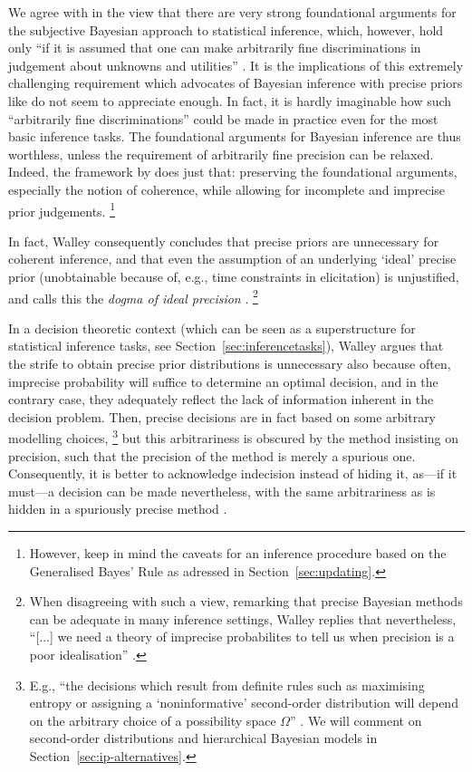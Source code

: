 We agree with \textcite[\S 1.1]{1994:berger} in the view that there are very strong foundational arguments
for the subjective Bayesian approach to statistical inference, which, however, hold only
``if it is assumed that one can make arbitrarily fine discriminations
in judgement about unknowns and utilities'' \parencite[p.~303]{1994:berger}. 
It is the implications of this extremely challenging requirement
which advocates of Bayesian inference with precise priors
like \textcite{1987:lindley} do not seem to appreciate enough.
In fact, it is hardly imaginable how such ``arbitrarily fine discriminations''
could be made in practice even for the most basic inference tasks.
The foundational arguments for Bayesian inference are thus worthless,
unless the requirement of arbitrarily fine precision can be relaxed.
Indeed, the framework by \textcite{1991:walley} does just that:
preserving the foundational arguments, especially the notion of coherence,
while allowing for incomplete and imprecise prior judgements.%
\footnote{However, keep in mind the caveats for an inference procedure based on the Generalised Bayes' Rule
as adressed in Section~\ref{sec:updating}.}

In fact, Walley consequently concludes that precise priors are unnecessary for coherent inference,
and that even the assumption of an underlying `ideal' precise prior
(unobtainable because of, e.g., time constraints in elicitation) is unjustified, %
and calls this the \emph{dogma of ideal precision} \parencite[\S 5.9]{1991:walley}.%
\footnote{When disagreeing with such a view, remarking that
precise Bayesian methods can be adequate in many inference settings,
Walley replies that nevertheless,
``[...] we need a theory of imprecise probabilites to tell us when precision is a poor idealisation''
\parencite[\S 5.8.1, item~3, p.~250]{1991:walley}.}

In a decision theoretic context
(which can be seen as a superstructure for statistical inference tasks, see Section~\ref{sec:inferencetasks}),
Walley argues that the strife to obtain precise prior distributions is unnecessary
also because often, imprecise probability will suffice to determine an optimal decision,
and in the contrary case, they adequately reflect the lack of information inherent in the decision problem.
Then, precise decisions are in fact based on some arbitrary modelling choices,%
\footnote{E.g., %
``the decisions which result from definite rules
such as maximising entropy or assigning a `noninformative' second-order distribution
will depend on the arbitrary choice of a possibility space $\Omega$''
\parencite[\S 5.6, footnote~16, p.~531]{1991:walley}.
We will comment on second-order distributions and hierarchical Bayesian models
in Section~\ref{sec:ip-alternatives}.}
but this arbitrariness is obscured by the method insisting on precision,
such that the precision of the method is merely a spurious one.
Consequently, it is better to acknowledge indecision instead of hiding it,
as---if it must---a decision can be made nevertheless,
with the same arbitrariness as is hidden in a spuriously precise method
\parencite[\S 5.7]{1991:walley}.


